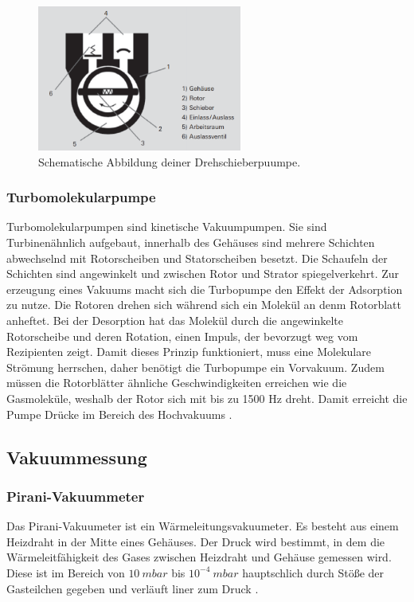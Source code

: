     \begin{figure}
        \centering
        \label{fig:Drehschieberpumpe}
        \includegraphics[width=0.6\textwidth]{Drehschieberpumpe.png}
        \caption{Schematische Abbildung deiner Drehschieberpuumpe.}
    \end{figure}

\subsubsection{Turbomolekularpumpe}
Turbomolekularpumpen sind kinetische Vakuumpumpen.
Sie sind Turbinenähnlich aufgebaut, innerhalb des Gehäuses sind mehrere Schichten abwechselnd mit Rotorscheiben und Statorscheiben besetzt.
Die Schaufeln der Schichten sind angewinkelt und zwischen Rotor und Strator spiegelverkehrt. 
Zur erzeugung eines Vakuums macht sich die Turbopumpe den Effekt der Adsorption zu nutze. Die Rotoren drehen sich während sich ein Molekül an denm Rotorblatt 
anheftet. Bei der Desorption hat das Molekül durch die angewinkelte Rotorscheibe und deren Rotation, einen Impuls, der bevorzugt weg vom Rezipienten zeigt.
Damit dieses Prinzip funktioniert, muss eine Molekulare Strömung herrschen, daher benötigt die Turbopumpe ein Vorvakuum. Zudem müssen die Rotorblätter ähnliche Geschwindigkeiten 
erreichen wie die Gasmoleküle, weshalb der Rotor sich mit bis zu 1500 Hz dreht.
Damit erreicht die Pumpe Drücke im Bereich des Hochvakuums \cite{Pfeiffer, S.83,84}.


\subsection{Vakuummessung}
\subsubsection{Pirani-Vakuummeter}
Das Pirani-Vakuumeter ist ein Wärmeleitungsvakuumeter. Es besteht aus einem Heizdraht in der Mitte eines Gehäuses.
Der Druck wird bestimmt, in dem die Wärmeleitfähigkeit des Gases zwischen Heizdraht und Gehäuse gemessen wird. 
Diese ist im Bereich von $10\: mbar$ bis $10^{-4}\: mbar$ hauptschlich durch Stöße der Gasteilchen gegeben und verläuft liner zum Druck \cite{Pfeiffer, S.93,94}.


